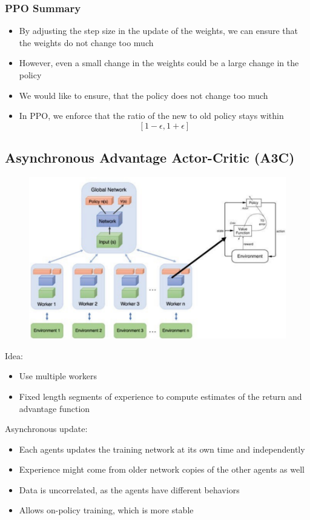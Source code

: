 \subsubsection*{PPO Summary}
\begin{itemize}
    \item By adjusting the step size in the update of the weights, we can ensure that the weights do not change too much
    \item However, even a small change in the weights could be a large change in the policy
    \item We would like to ensure, that the policy does not change too much
    \item In PPO, we enforce that the ratio of the new to old policy stays within 
    \[
    \left[1-\epsilon,1 + \epsilon\right]
    \]
\end{itemize}
\subsection{Asynchronous Advantage Actor-Critic (A3C)}
\begin{figure}[h!]
    \includegraphics[width = \columnwidth]{
        figures/DeepReinforcementLearning3/A3C.png
    }
\end{figure}
Idea:
\begin{itemize}
    \item Use multiple workers
    \item Fixed length segments of experience to compute estimates of the return and advantage function
\end{itemize}
Asynchronous update:
\begin{itemize}
    \item Each agents updates the training network at its own time and independently
    \item Experience might come from older network copies of the other agents as well
    \item Data is uncorrelated, as the agents have different behaviors
    \item Allows on-policy training, which is more stable
\end{itemize}
